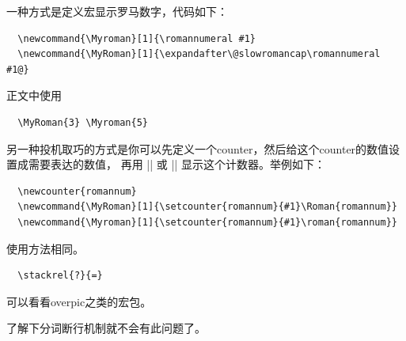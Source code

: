 










一种方式是定义宏显示罗马数字，代码如下：
\begin{verbatim}
  \newcommand{\Myroman}[1]{\romannumeral #1}
  \newcommand{\MyRoman}[1]{\expandafter\@slowromancap\romannumeral #1@}
\end{verbatim}
正文中使用
\begin{verbatim}
  \MyRoman{3} \Myroman{5}
\end{verbatim}

另一种投机取巧的方式是你可以先定义一个counter，然后给这个counter的数值设置成需要表达的数值，
再用 |\Roman| 或 |\roman| 显示这个计数器。举例如下：
\begin{verbatim}
  \newcounter{romannum}
  \newcommand{\MyRoman}[1]{\setcounter{romannum}{#1}\Roman{romannum}}
  \newcommand{\Myroman}[1]{\setcounter{romannum}{#1}\roman{romannum}}
\end{verbatim}
使用方法相同。



\begin{verbatim}
  \stackrel{?}{=}
\end{verbatim}



可以看看overpic之类的宏包。



了解下分词断行机制就不会有此问题了。








